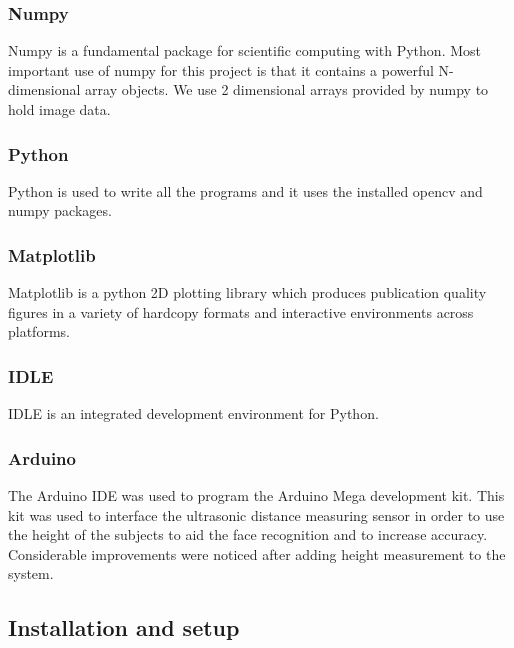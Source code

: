 \documentclass[a4paper,12pt]{article}
\begin{document}
 \subsubsection*{Numpy}
 Numpy is a fundamental package for scientific computing with Python. Most important use of numpy for this project is that it contains
 a powerful N-dimensional array objects. We use 2 dimensional arrays provided by numpy to hold image data.

 \subsubsection*{Python}
 Python is used to write all the programs and it uses the installed opencv and numpy packages.

 \subsubsection*{Matplotlib}
 Matplotlib is a python 2D plotting library which produces publication quality figures in a variety of hardcopy formats and interactive 
 environments across platforms.

 \subsubsection*{IDLE}
 IDLE is an integrated development environment for Python.
 
 \subsubsection*{Arduino}
 The Arduino IDE was used to program the Arduino Mega development kit. This   kit was used to interface the ultrasonic distance measuring 
 sensor in order to use the height of the subjects to aid the face recognition and to increase accuracy. Considerable improvements were 
 noticed after adding height measurement to the system.


\subsection{Installation and setup}
\end{document}
